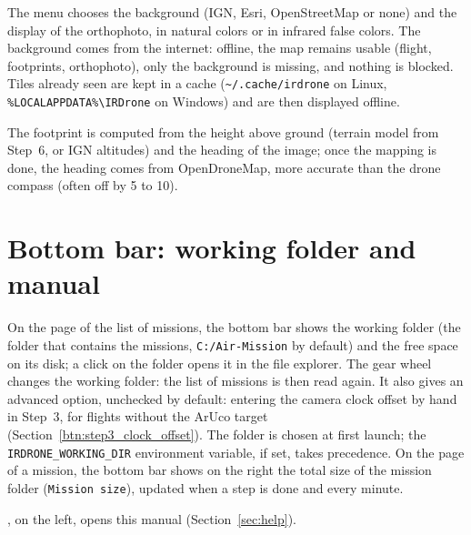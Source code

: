 \documentclass[a4paper,11pt]{report}
\DeclareRobustCommand{\bouton}[1]{\texorpdfstring{\fbox{\small\textsf{#1}}}{#1}}
\begin{document}
The \bouton{Layers} menu chooses the background (IGN, Esri, OpenStreetMap or none) and the display of the orthophoto, in natural colors or in infrared false colors. The background comes from the internet: offline, the map remains usable (flight, footprints, orthophoto), only the background is missing, and nothing is blocked. Tiles already seen are kept in a cache (\texttt{\textasciitilde/.cache/irdrone} on Linux, \texttt{\%LOCALAPPDATA\%\textbackslash IRDrone} on Windows) and are then displayed offline.

The footprint is computed from the height above ground (terrain model from Step~6, or IGN altitudes) and the heading of the image; once the mapping is done, the heading comes from OpenDroneMap, more accurate than the drone compass (often off by 5 to 10\textdegree).


\section{Bottom bar: working folder and manual}\label{btn:home_workdir}
On the page of the list of missions, the bottom bar shows the working folder (the folder that contains the missions, \texttt{C:/Air-Mission} by default) and the free space on its disk; a click on the folder opens it in the file explorer. The \bouton{⚙} gear wheel changes the working folder: the list of missions is then read again. It also gives an advanced option, unchecked by default: entering the camera clock offset by hand in Step~3, for flights without the ArUco target (Section~\ref{btn:step3_clock_offset}). The folder is chosen at first launch; the \texttt{IRDRONE\_WORKING\_DIR} environment variable, if set, takes precedence. On the page of a mission, the bottom bar shows on the right the total size of the mission folder (\texttt{Mission size}), updated when a step is done and every minute.

\bouton{?}, on the left, opens this manual (Section~\ref{sec:help}).
\end{document}

